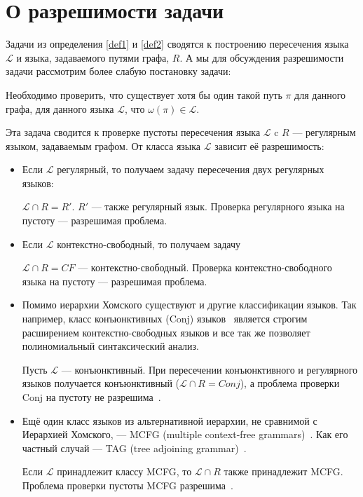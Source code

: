 \section{О разрешимости задачи}

Задачи из определения \ref{def1} и \ref{def2} сводятся к построению пересечения языка $\mathcal{L}$ и языка, задаваемого путями графа, $R$. 
А мы для обсуждения разрешимости задачи рассмотрим более слабую постановку задачи:

\begin{definition}
    Необходимо проверить, что существует хотя бы один такой путь $\pi$ для данного графа, для данного языка $\mathcal{L}$, что $\omega(\pi) \in \mathcal{L}$.
    
\end{definition}

Эта задача сводится к проверке пустоты пересечения языка $\mathcal{L}$ c $R$ --- регулярным языком, задаваемым графом. От класса языка $\mathcal{L}$ зависит её разрешимость:

\begin{itemize}
    \item Если $\mathcal{L}$ регулярный, то получаем задачу пересечения двух регулярных языков: 
    
    $\mathcal{L} \cap R = R'$.
    $R'$ --- также регулярный язык.
    Проверка регулярного языка на пустоту --- разрешимая проблема.
    
    \item Если $\mathcal{L}$ контекстно-свободный, то получаем задачу
    
    $\mathcal{L} \cap R = CF$ --- контекстно-свободный.
    Проверка контекстно-свободного языка на пустоту --- разрешимая проблема.
    
    \item Помимо иерархии Хомского существуют и другие классификации языков.
    Так например, класс конъюнктивных (Conj)
    языков~\cite{DBLP:journals/jalc/Okhotin01}
    является строгим расширением контекстно-свободных языков и все так же позволяет полиномиальный синтаксический анализ.
    
    Пусть $\mathcal{L}$ --- конъюнктивный. При пересечении конъюнктивного и регулярного языков получается конъюнктивный ($\mathcal{L} \cap R = Conj$), а проблема проверки Conj на пустоту не разрешима~\cite{DBLP:journals/tcs/Okhotin03a}.
    
    \item Ещё один класс языков из альтернативной иерархии, не сравнимой с Иерархией Хомского, --- MCFG (multiple context-free grammars)~\cite{SEKI1991191}.
    Как его частный случай --- TAG (tree adjoining grammar)~\cite{Joshi1997}.
    
    Если $\mathcal{L}$ принадлежит классу MCFG, то $\mathcal{L} \cap R$ также принадлежит MCFG. Проблема проверки пустоты MCFG разрешима~\cite{SEKI1991191}.
    
\end{itemize}

